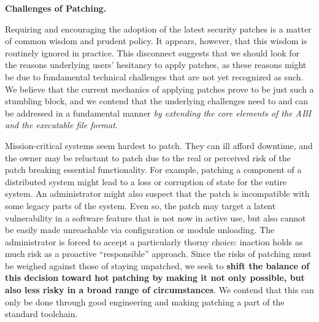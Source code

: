 {\bf Challenges of Patching.}
\label{ssec:challenges}

Requiring and encouraging the adoption of the latest security patches
is a matter of common wisdom and prudent policy.  It appears, however,
that this wisdom is routinely ignored in practice.  This disconnect
suggests that we should look for the reasons underlying users'
hesitancy to apply patches, as these reasons might be due to
fundamental technical challenges that are not yet recognized as such.
We believe that the current mechanics of applying patches prove to be
just such a stumbling block, and we contend that the underlying
challenges need to and can be addressed in a fundamental manner {\em
  by extending the core elements of the ABI and the executable file
  format}.


Mission-critical systems seem hardest to patch.  They can ill afford
downtime, and the owner may be reluctant to patch due to the real or
perceived risk of the patch breaking essential functionality.  For
example, patching a component of a distributed system might lead to a
loss or corruption of state for the entire system.  An administrator
might also suspect that the patch is incompatible with some legacy
parts of the system.  Even so, the patch may target a latent
vulnerability in a software feature that is not now in active use, but
also cannot be easily made unreachable via configuration or module
unloading.  The administrator is forced to accept a particularly
thorny choice: inaction holds as much risk as a proactive
``responsible'' approach.  Since the risks of patching must
be weighed against those of staying unpatched, we seek to
{\bf shift the balance of this decision toward hot patching by making
  it not only possible, but also less risky in a broad range of
  circumstances}. We contend that this can only be done through good
engineering and making patching a part of the standard toolchain.

